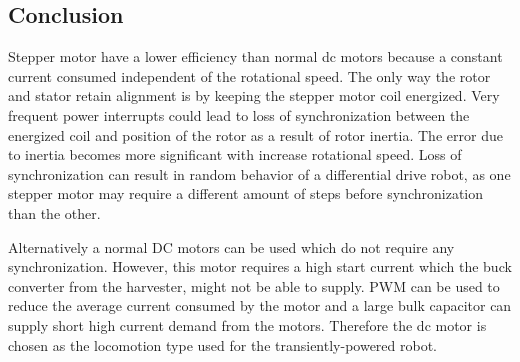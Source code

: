 \subsection{Conclusion}
Stepper motor have a lower efficiency than normal dc motors because a constant current consumed independent of the rotational speed.
The only way the rotor and stator retain alignment is by keeping the stepper motor coil energized.
Very frequent power interrupts could lead to loss of synchronization between the energized coil and position of the rotor as a result of rotor inertia.
The error due to inertia becomes more significant with increase rotational speed.
Loss of synchronization can result in random behavior of a differential drive robot, as one stepper motor may require a different amount of steps before synchronization than the other.

Alternatively a normal DC motors can be used which do not require any synchronization.
However, this motor requires a high start current which the buck converter from the harvester, might not be able to supply.
PWM can be used to reduce the average current consumed by the motor and a large bulk capacitor can supply short high current demand from the motors.
Therefore the dc motor is chosen as the locomotion type used for the transiently-powered robot.
